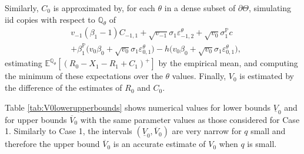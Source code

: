 \documentclass[11pt,a4paper]{article}
\newcommand{\E}{\mathbb{E}}
\renewcommand{\P}{\mathbb{P}}
\newcommand{\Q}{\mathbb{Q}}
\begin{document}
Similarly, $C_0$ is approximated by, for each $\theta$ in a dense subset of $\partial \Theta$, simulating iid copies with respect to $\Q_{\theta}$ of 
\begin{align*}
&v_{-1}(\beta_1-1)C_{-1,1}+\sqrt{v_{-1}}\sigma_1\varepsilon_{-1,2}^{\theta}+\sqrt{v_0}\sigma_1^{\P}c\\
&+\beta_1^{\P}\bigg(v_0\beta_0+\sqrt{v_0}\sigma_1\varepsilon_{0,1}^{\theta}\bigg)
-h\bigg(v_0\beta_0+\sqrt{v_0}\sigma_1\varepsilon_{0,1}^{\theta}\bigg),
\end{align*} 
estimating $\E^{\Q_{\theta}}[(R_0-X_1-R_1+C_1)^{+}]$ by the empirical mean, and computing the minimum of these expectations over the $\theta$ values. Finally, $V_0$ is estimated by the difference of the estimates of $R_0$ and $C_0$.   

Table \ref{tab:V0lowerupperbounds} shows numerical values for lower bounds $\underline{V}_0$ and for upper bounds $\overline{V}_0$ with the same parameter values as those considered for Case 1.  
Similarly to Case 1, the intervals $(\underline{V}_0,\overline{V}_0)$ are very narrow for $q$ small and therefore the upper bound $\overline{V}_0$ is an accurate estimate of $V_0$ when $q$ is small. 
\end{document}
